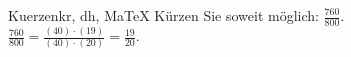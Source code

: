 \begin{MAufgabe}{Kuerzen}{kr, dh, MaTeX}
K\"urzen Sie soweit m\"oglich: $\frac{760}{800}$.\\ 
\ifLsg\MLoesung
\quad $\frac{760}{800}=\frac{(40)\cdot(19)}{(40)\cdot(20)}=\frac{19}{20}$.\else\relax\fi
 \end{MAufgabe}